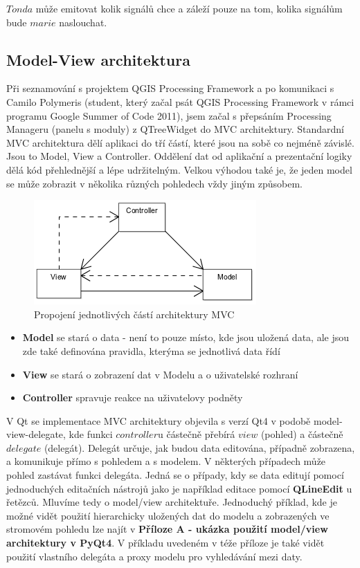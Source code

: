 \noindent $Tonda$ může emitovat kolik signálů chce a záleží pouze na tom, kolika signálům bude $marie$ naslouchat.

\subsection{Model-View architektura}
Při seznamování s projektem QGIS Processing Framework a po komunikaci s Camilo Polymeris (student, který začal psát QGIS Processing Framework v rámci programu Google Summer of Code 2011), jsem začal s přepsáním Processing Manageru (panelu s moduly) z QTreeWidget do MVC architektury. Standardní MVC architektura dělí aplikaci do tří částí, které jsou na sobě co nejméně závislé. Jsou to Model, View a Controller. Oddělení dat od aplikační a prezentační logiky dělá kód přehlednější a lépe udržitelným. Velkou výhodou také je, že jeden model se může zobrazit v několika různých pohledech vždy jiným způsobem.

\begin{figure}[h]
	\centering
	\includegraphics[scale=0.7]{pictures/qt/mvc}
	\caption{Propojení jednotlivých částí architektury MVC}
	\label{mvc}
\end{figure}

\begin{itemize}
	\item{\textbf{Model}} se stará o data - není to pouze místo, kde jsou uložená data, ale jsou zde také definována pravidla, kterýma se jednotlivá data řídí
	\item{\textbf{View}} se stará o zobrazení dat v Modelu a o uživatelské rozhraní
	\item{\textbf{Controller}} spravuje reakce na uživatelovy podněty %
\end{itemize}

V Qt se implementace MVC architektury objevila s verzí Qt4 v podobě model-view-delegate, kde funkci $controller$u částečně přebírá $view$ (pohled) a částečně $delegate$ (delegát). Delegát určuje, jak budou data editována, případně zobrazena, a komunikuje přímo s pohledem a s modelem. V některých případech může pohled zastávat funkci delegáta. Jedná se o případy, kdy se data editují pomocí jednoduchých editačních nástrojů jako je například editace pomocí \textbf{QLineEdit} u řetězců. Mluvíme tedy o model/view architektuře. Jednoduchý příklad, kde je možné vidět použití hierarchicky uložených dat do modelu a zobrazených ve stromovém pohledu lze najít v \textbf{Příloze A - ukázka použití model/view architektury v PyQt4}. V příkladu uvedeném v téže příloze je také vidět použití vlastního delegáta a proxy modelu pro vyhledávání mezi daty.

